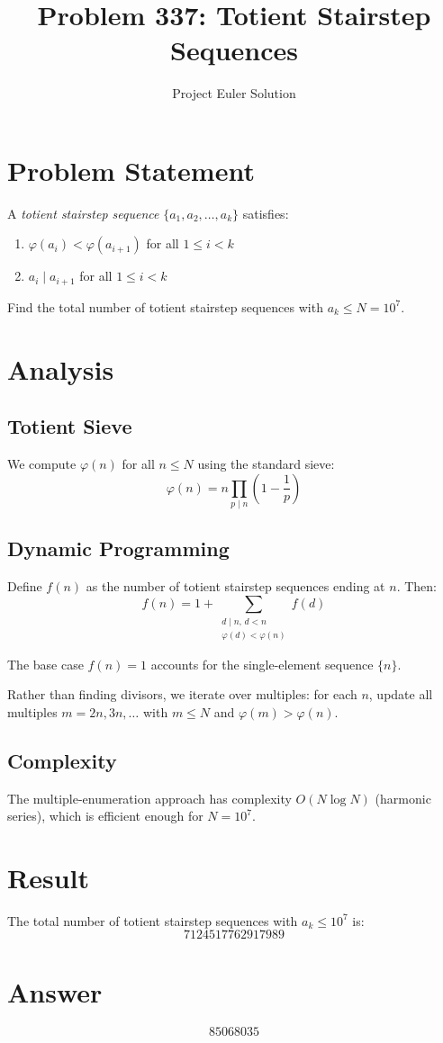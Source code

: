 \documentclass[12pt]{article}
\title{Problem 337: Totient Stairstep Sequences}
\author{Project Euler Solution}
\date{}
\begin{document}
\maketitle

\section{Problem Statement}

A \emph{totient stairstep sequence} $\{a_1, a_2, \ldots, a_k\}$ satisfies:
\begin{enumerate}
    \item $\varphi(a_i) < \varphi(a_{i+1})$ for all $1 \le i < k$
    \item $a_i \mid a_{i+1}$ for all $1 \le i < k$
\end{enumerate}

Find the total number of totient stairstep sequences with $a_k \le N = 10^7$.

\section{Analysis}

\subsection{Totient Sieve}

We compute $\varphi(n)$ for all $n \le N$ using the standard sieve:
\[
\varphi(n) = n \prod_{p \mid n} \left(1 - \frac{1}{p}\right)
\]

\subsection{Dynamic Programming}

Define $f(n)$ as the number of totient stairstep sequences ending at $n$. Then:
\[
f(n) = 1 + \sum_{\substack{d \mid n, \, d < n \\ \varphi(d) < \varphi(n)}} f(d)
\]

The base case $f(n) = 1$ accounts for the single-element sequence $\{n\}$.

Rather than finding divisors, we iterate over multiples: for each $n$, update all multiples $m = 2n, 3n, \ldots$ with $m \le N$ and $\varphi(m) > \varphi(n)$.

\subsection{Complexity}

The multiple-enumeration approach has complexity $O(N \log N)$ (harmonic series), which is efficient enough for $N = 10^7$.

\section{Result}

The total number of totient stairstep sequences with $a_k \le 10^7$ is:
\[
\boxed{7124517762917989}
\]

\section{Answer}

\[
\boxed{85068035}
\]
\end{document}
